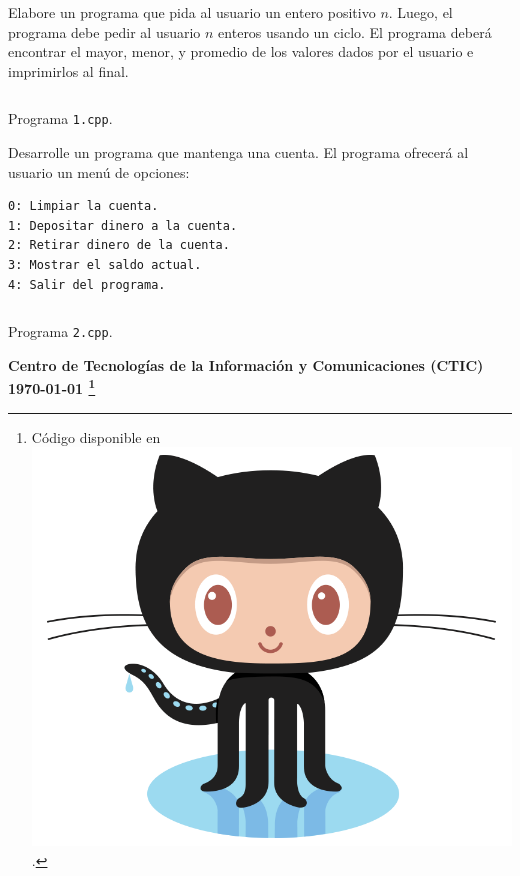 \documentclass[spanish,addpoints,answers,a4paper]{exam}
\newcommand{\unmarkedfntext}[1]{%
	\begingroup
	\renewcommand\thefootnote{}\footnote{#1}%
	\addtocounter{footnote}{-1}%
	\endgroup
}
\newcommand{\mychar}{%
	\begingroup\normalfont
	\includegraphics[height=\fontcharht\font`\B]{Octocat.png}%
	\endgroup
}
\begin{document}
\begin{questions}

\question Elabore un programa que pida al usuario un entero positivo $n$. Luego, el programa debe pedir al usuario $n$ enteros usando un ciclo. El programa deberá encontrar el mayor, menor, y promedio de los valores dados por el usuario e imprimirlos al final.

\begin{solution}
	\begin{listing}[H]
		\footnotesize
		\inputminted{cpp}{1.cpp}
		\caption{Programa \texttt{1.cpp}.}
		\label{lst:1.9}
\end{listing}
\end{solution}

\question Desarrolle un programa que mantenga una cuenta. El programa ofrecerá al usuario un menú de opciones:

\begin{verbatim}
0: Limpiar la cuenta.
1: Depositar dinero a la cuenta.
2: Retirar dinero de la cuenta.
3: Mostrar el saldo actual.
4: Salir del programa.
\end{verbatim}

\begin{solution}
	\begin{listing}[H]
		\footnotesize
		\inputminted{cpp}{2.cpp}
		\caption{Programa \texttt{2.cpp}.}
		\label{lst:1.10}
\end{listing}
\end{solution}

\end{questions}

\begin{flushright}\bfseries
Centro de Tecnologías de la Información y Comunicaciones (CTIC)\\[2mm]
\today\unmarkedfntext{Código disponible en \href{https://github.com/carlosal1015/Cpp-Programming}{\mychar{}}.}
\end{flushright}
\end{document}
